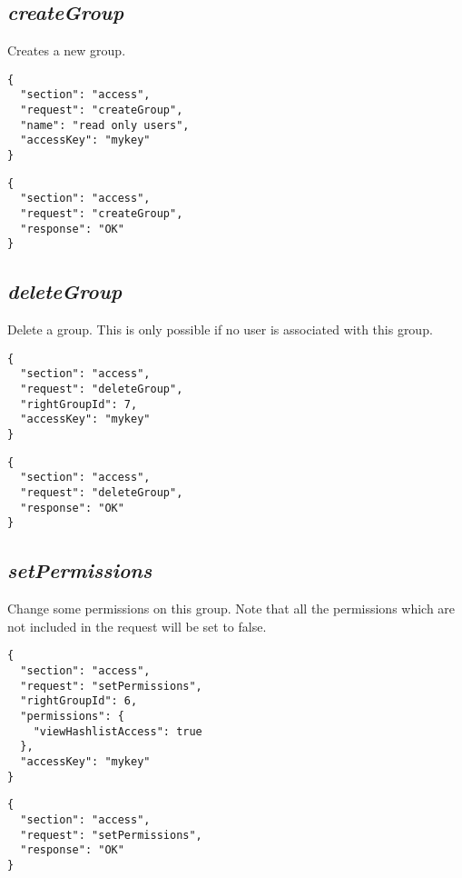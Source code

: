 \subsection*{\textit{createGroup}}
	Creates a new group.
	{
		\color{blue}
		\begin{verbatim}
{
  "section": "access",
  "request": "createGroup",
  "name": "read only users",
  "accessKey": "mykey"
}
		\end{verbatim}
	}
	{
		\color{OliveGreen}
		\begin{verbatim}
{
  "section": "access",
  "request": "createGroup",
  "response": "OK"
}
		\end{verbatim}
	}
\subsection*{\textit{deleteGroup}}
	Delete a group. This is only possible if no user is associated with this group.
	{
		\color{blue}
		\begin{verbatim}
{
  "section": "access",
  "request": "deleteGroup",
  "rightGroupId": 7,
  "accessKey": "mykey"
}
		\end{verbatim}
	}
	{
		\color{OliveGreen}
		\begin{verbatim}
{
  "section": "access",
  "request": "deleteGroup",
  "response": "OK"
}
		\end{verbatim}
	}
\subsection*{\textit{setPermissions}}
	Change some permissions on this group. Note that all the permissions which are not included in the request will be set to false.
	{
		\color{blue}
		\begin{verbatim}
{
  "section": "access",
  "request": "setPermissions",
  "rightGroupId": 6,
  "permissions": {
    "viewHashlistAccess": true
  },
  "accessKey": "mykey"
}
		\end{verbatim}
	}
	{
		\color{OliveGreen}
		\begin{verbatim}
{
  "section": "access",
  "request": "setPermissions",
  "response": "OK"
}
		\end{verbatim}
	}


